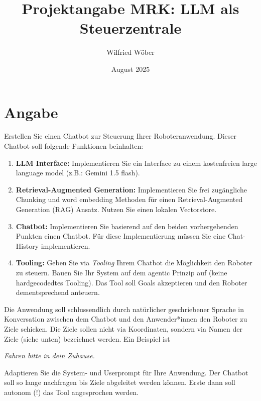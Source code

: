 \documentclass{article}
\title{Projektangabe MRK: LLM als Steuerzentrale}
\author{Wilfried Wöber}
\date{August 2025}
\begin{document}
\maketitle
\section{Angabe}
Erstellen Sie einen Chatbot zur Steuerung Ihrer Roboteranwendung. 
Dieser Chatbot soll folgende Funktionen beinhalten:
\begin{enumerate}
    \item \textbf{LLM Interface:} Implementieren Sie ein Interface zu einem kostenfreien large language model (z.B.: Gemini 1.5 flash). 
    \item \textbf{Retrieval-Augmented Generation:} Implementieren Sie frei zugängliche Chunking und word embedding Methoden für einen Retrieval-Augmented Generation (RAG) Ansatz. Nutzen Sie einen lokalen Vectorstore. 
    \item \textbf{Chatbot:} Implementieren Sie basierend auf den beiden vorhergehenden Punkten einen Chatbot. Für diese Implementierung müssen Sie eine Chat-History implementieren.
    \item \textbf{Tooling:} Geben Sie via \textit{Tooling} Ihrem Chatbot die Möglichkeit den Roboter zu steuern. Bauen Sie Ihr System auf dem agentic Prinzip auf (keine hardgecodedtes Tooling). Das Tool soll Goals akzeptieren und den Roboter dementsprechend anteuern. 
\end{enumerate}
Die Anwendung soll schlussendlich durch natürlicher geschriebener Sprache in Konversation zwischen dem Chatbot und den Anwender*innen den Roboter zu Ziele schicken. 
Die Ziele sollen nicht via Koordinaten, sondern via Namen der Ziele (siehe unten) bezeichnet werden.
Ein Beispiel ist
\begin{center}
    \textit{Fahren bitte in dein Zuhause.}
\end{center}
Adaptieren Sie die System- und Userprompt für Ihre Anwendung. 
Der Chatbot soll so lange nachfragen bis Ziele abgeleitet werden können. 
Erste dann soll autonom (!) das Tool angesprochen werden.
\end{document}
